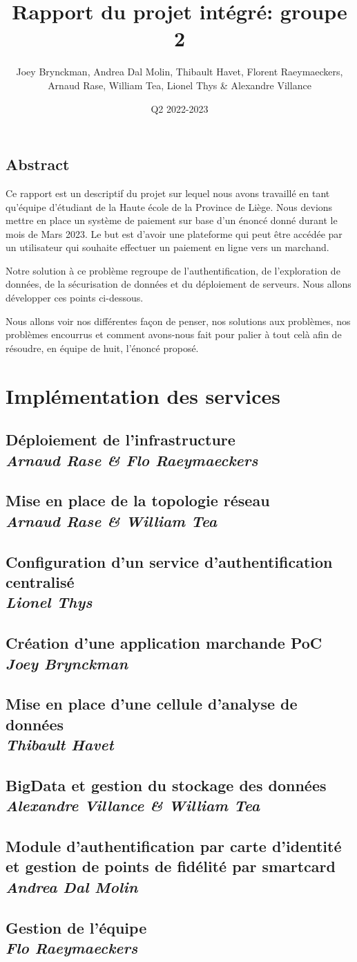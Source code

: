 \documentclass[11pt]{report}
\title{Rapport du projet intégré: groupe 2}
\author{Joey Brynckman, Andrea Dal Molin, Thibault Havet, Florent Raeymaeckers,  \\ Arnaud Rase, William Tea, Lionel Thys \& Alexandre Villance}
\date{Q2 2022-2023}
\newcommand\Chapter[2]{\chapter
  [#1\hfil\hbox{}\protect\linebreak{\itshape#2}]%
  {#1\\[2ex]\large\itshape#2}%
}
\begin{document}
\maketitle

\tableofcontents

\chapter*{Abstract}

Ce rapport est un descriptif du projet sur lequel nous avons travaillé en tant qu'équipe d'étudiant de la Haute école de la Province de Liège. Nous devions mettre en place un système de paiement sur base d'un énoncé donné durant le mois de Mars 2023. Le but est d'avoir une plateforme qui peut être accédée par un utilisateur qui souhaite effectuer un paiement en ligne vers un marchand.

Notre solution à ce problème regroupe de l'authentification, de l'exploration de données, de la sécurisation de données et du déploiement de serveurs. Nous allons développer ces points ci-dessous.

Nous allons voir nos différentes façon de penser, nos solutions aux problèmes, nos problèmes encourrus et comment avons-nous fait pour palier à tout celà afin de résoudre, en équipe de huit, l'énoncé proposé.


\part{Implémentation des services}

\Chapter{Déploiement de l'infrastructure}{Arnaud Rase \& Flo Raeymaeckers}



\Chapter{Mise en place de la topologie réseau}{Arnaud Rase \& William Tea}



\Chapter{Configuration d'un service d'authentification centralisé}{Lionel Thys}



\Chapter{Création d'une application marchande PoC}{Joey Brynckman}



\Chapter{Mise en place d'une cellule d'analyse de données}{Thibault Havet}



\Chapter{BigData et gestion du stockage des données}{Alexandre Villance \& William Tea}



\Chapter{Module d'authentification par carte d'identité et gestion de points de fidélité par smartcard}{Andrea Dal Molin}



\Chapter{Gestion de l'équipe}{Flo Raeymaeckers}





\end{document}

